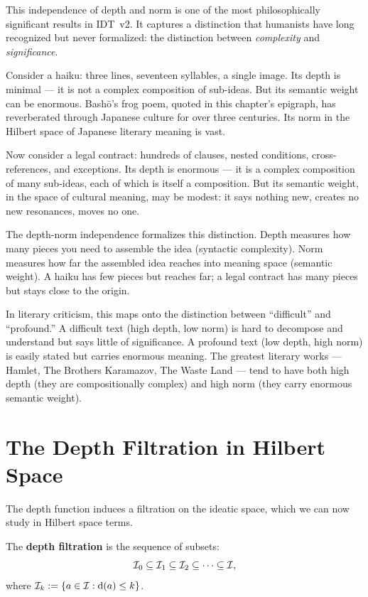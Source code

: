 \begin{interpretation}
\label{interp:haiku}
This independence of depth and norm is one of the most philosophically
significant results in IDT~v2. It captures a distinction that humanists have
long recognized but never formalized: the distinction between
\emph{complexity} and \emph{significance}.

Consider a haiku: three lines, seventeen syllables, a single image. Its depth
is minimal --- it is not a complex composition of sub-ideas. But its semantic
weight can be enormous. Bash\=o's frog poem, quoted in this chapter's epigraph,
has reverberated through Japanese culture for over three centuries. Its norm
in the Hilbert space of Japanese literary meaning is vast.

Now consider a legal contract: hundreds of clauses, nested conditions, cross-
references, and exceptions. Its depth is enormous --- it is a complex
composition of many sub-ideas, each of which is itself a composition. But its
semantic weight, in the space of cultural meaning, may be modest: it says
nothing new, creates no new resonances, moves no one.

The depth-norm independence formalizes this distinction. Depth measures how
many pieces you need to assemble the idea (syntactic complexity). Norm
measures how far the assembled idea reaches into meaning space (semantic
weight). A haiku has few pieces but reaches far; a legal contract has many
pieces but stays close to the origin.

In literary criticism, this maps onto the distinction between ``difficult''
and ``profound.'' A difficult text (high depth, low norm) is hard to
decompose and understand but says little of significance. A profound text
(low depth, high norm) is easily stated but carries enormous meaning.
The greatest literary works --- Hamlet, The Brothers Karamazov, The
Waste Land --- tend to have both high depth (they are compositionally
complex) and high norm (they carry enormous semantic weight).
\end{interpretation}


\section{The Depth Filtration in Hilbert Space}

The depth function induces a filtration on the ideatic space, which we can now
study in Hilbert space terms.

\begin{definition}
\label{def:filtration}
The \textbf{depth filtration} is the sequence of subsets:
\[
  \mathcal{I}_0 \subseteq \mathcal{I}_1 \subseteq \mathcal{I}_2 \subseteq \cdots \subseteq \mathcal{I},
\]
where $\mathcal{I}_k := \{a \in \mathcal{I} : \operatorname{d}(a) \leq k\}$.
\end{definition}

